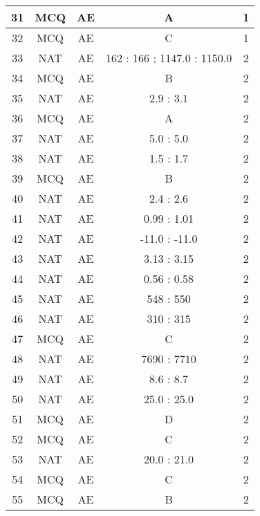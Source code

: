 \begin{tabular}[12pt]{ |c|c|c|c|c| }
    \hline
    31 & MCQ & AE & A & 1 \\
    \hline
    32 & MCQ & AE & C & 1 \\
    \hline
    33 & NAT & AE & 162 : 166 ; 1147.0 : 1150.0 & 2 \\
    \hline
    34 & MCQ & AE & B & 2 \\
    \hline
    35 & NAT & AE & 2.9 : 3.1 & 2 \\
    \hline
    36 & MCQ & AE & A & 2 \\
    \hline
    37 & NAT & AE & 5.0 : 5.0 & 2 \\
    \hline
    38 & NAT & AE & 1.5 : 1.7 & 2 \\
    \hline
    39 & MCQ & AE & B & 2 \\
    \hline
    40 & NAT & AE & 2.4 : 2.6 & 2 \\
    \hline
    41 & NAT & AE & 0.99 : 1.01 & 2 \\
    \hline
    42 & NAT & AE & -11.0 : -11.0 & 2 \\
    \hline
    43 & NAT & AE & 3.13 : 3.15 & 2 \\
    \hline
    44 & NAT & AE & 0.56 : 0.58 & 2 \\
    \hline
    45 & NAT & AE & 548 : 550 & 2 \\
    \hline
    46 & NAT & AE & 310 : 315 & 2 \\
    \hline
    47 & MCQ & AE & C & 2 \\
    \hline
    48 & NAT & AE & 7690 : 7710 & 2 \\
    \hline
    49 & NAT & AE & 8.6 : 8.7 & 2 \\
    \hline
    50 & NAT & AE & 25.0 : 25.0 & 2 \\
    \hline
    51 & MCQ & AE & D & 2 \\
    \hline
    52 & MCQ & AE & C & 2 \\
    \hline
    53 & NAT & AE & 20.0 : 21.0 & 2 \\
    \hline
    54 & MCQ & AE & C & 2 \\
    \hline
    55 & MCQ & AE & B & 2 \\
    \hline

\end{tabular}
